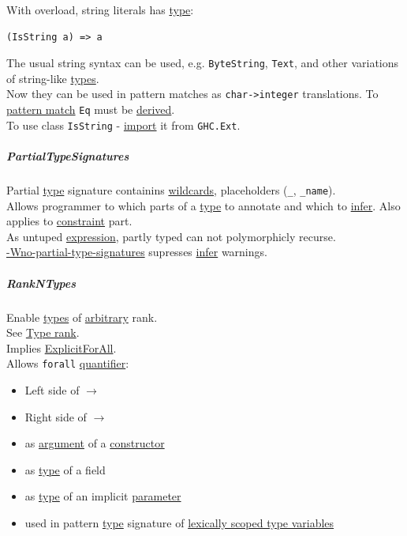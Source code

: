 \documentclass[11pt]{article}
\begin{document}
With overload, string literals has \hyperref[orgc4aea2f]{type}:\\
\begin{verbatim}
(IsString a) => a
\end{verbatim}

The usual string syntax can be used, e.g. \texttt{ByteString}, \texttt{Text}, and other variations of string-like \hyperref[org4209edd]{types}.\\
Now they can be used in pattern matches as \texttt{char->integer} translations. To \hyperref[org8d84a1a]{pattern match} \texttt{Eq} must be \hyperref[org8c97145]{derived}.\\

To use class \texttt{IsString} - \hyperref[orge7bdadf]{import} it from \texttt{GHC.Ext}.\\

\subparagraph{\label{orgdd7d979}PartialTypeSignatures}
\label{sec:org1a53f89}
Partial \hyperref[orgc4aea2f]{type} signature containins \hyperref[org9add70a]{wildcards}, placeholders (\texttt{\_}, \texttt{\_name}).\\
Allows programmer to which parts of a \hyperref[orgc4aea2f]{type} to annotate and which to \hyperref[org6da926a]{infer}. Also applies to \hyperref[org180980d]{constraint} part.\\

As untuped \hyperref[org9021dd7]{expression}, partly typed can not polymorphicly recurse.\\

\hyperref[org73877c4]{-Wno-partial-type-signatures} supresses \hyperref[org6da926a]{infer} warnings.\\

\subparagraph{\label{orga7c1c21}RankNTypes}
\label{sec:org2e7688f}
Enable \hyperref[org4209edd]{types} of \hyperref[orga23d095]{arbitrary} rank.\\
See \hyperref[org6b9f1c6]{Type rank}.\\

Implies \hyperref[orgebd5f50]{ExplicitForAll}.\\

Allows \texttt{forall} \hyperref[org357bc41]{quantifier}:\\
\begin{itemize}
\item Left side of \(\to\)\\
\item Right side of \(\to\)\\
\item as \hyperref[orga6b7e97]{argument} of a \hyperref[orgf4d811d]{constructor}\\
\item as \hyperref[orgc4aea2f]{type} of a field\\
\item as \hyperref[orgc4aea2f]{type} of an implicit \hyperref[org0e7674e]{parameter}\\
\item used in pattern \hyperref[orgc4aea2f]{type} signature of \hyperref[org19688d5]{lexically scoped type variables}\\
\end{itemize}
\end{document}
